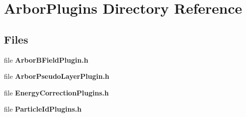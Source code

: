 \section{Arbor\+Plugins Directory Reference}
\label{dir_33481849bac8a3c040ccb2bf01a0ea7f}
\subsection*{Files}
\begin{DoxyCompactItemize}
\item 
file {\bf Arbor\+B\+Field\+Plugin.\+h}
\item 
file {\bf Arbor\+Pseudo\+Layer\+Plugin.\+h}
\item 
file {\bf Energy\+Correction\+Plugins.\+h}
\item 
file {\bf Particle\+Id\+Plugins.\+h}
\end{DoxyCompactItemize}
